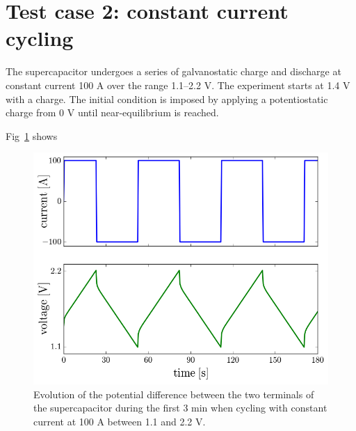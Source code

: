 \documentclass[10pt, oneside]{article}   	%
\begin{document}
\section{Test case 2: constant current cycling}
The supercapacitor undergoes a series of galvanostatic charge and discharge at
constant current 100 A over the range 1.1--2.2 V.
The experiment starts at 1.4 V with a charge.  The initial condition is
imposed by applying a potentiostatic charge from 0 V until near-equilibrium
is reached.

Fig~\ref{fig:constant_current_cycling_current_and_voltage} shows

\begin{figure}[h!]
    \centering
    \includegraphics[width=\textwidth]{figures/constant_current_cycling_current_and_voltage}
    \caption{Evolution of the potential difference between the two terminals
of the supercapacitor during the first 3 min when cycling with constant
current at 100 A between 1.1 and 2.2 V.
    }
    \label{fig:constant_current_cycling_current_and_voltage}
\end{figure}
\end{document}
